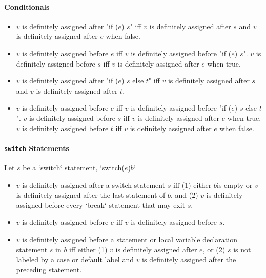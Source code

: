 \paragraph{Conditionals}

\begin{itemize}    
\item $v$ is definitely assigned after \xcdmath"if ($e$) $s$" iff $v$ is definitely assigned after $s$ and $v$ is definitely assigned after $e$ when false.
    \item $v$ is definitely assigned before $e$ iff $v$ is definitely assigned
          before
\xcdmath"if ($e$) $s$".
$v$ is definitely assigned before $s$ iff $v$ is definitely assigned after $e$ when true.
    \item $v$ is definitely assigned after \xcdmath"if ($e$) $s$ else $t$" iff $v$ is definitely assigned after $s$ and $v$ is definitely assigned after $t$.
    \item $v$ is definitely assigned before $e$ iff $v$ is definitely assigned
          before \xcdmath"if ($e$) $s$ else $t$". $v$ is definitely assigned before $s$
          iff $v$ is definitely assigned after $e$ when true. $v$ is
          definitely assigned before $t$ iff $v$ is definitely assigned after
          $e$ when false. 
\end{itemize}

\paragraph{{\tt switch} Statements}
Let $s$ be a \xcd`switch` statement, \xcdmath`switch($e$)$b$`
\begin{itemize}
    \item $v$ is definitely assigned after a switch statement $s$ iff 
          (1) either $b$is empty or $v$ is definitely assigned
              after the last statement of $b$, 
          and 
          (2) $v$ is definitely assigned before every \xcd`break` statement
              that may exit $s$.
    \item $v$ is definitely assigned before $e$ iff $v$ is definitely assigned before $s$.
    \item $v$ is definitely assigned before a statement or local variable
          declaration statement $s$ in $b$ iff either 
          (1) $v$ is definitely assigned after $e$, or 
          (2) $s$ is not labeled by a case or default label and $v$ is
              definitely assigned after the preceding statement.  
\end{itemize}

